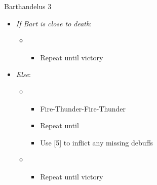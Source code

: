 \begin{battle}[1:24]{Barthandelus 3}
\begin{itemize}
			\item \textit{If Bart is close to death}:
			      \begin{itemize}
				      \item \first
				            \begin{itemize}
					            \item Repeat until victory
				            \end{itemize}
			      \end{itemize}
			\item \textit{Else}:
			      \begin{itemize}
				      \item \sixth
				            \begin{itemize}
					            \item Fire-Thunder-Fire-Thunder
					            \item Repeat until \stagger
					            \item Use [5] to inflict any missing debuffs
				            \end{itemize}
				      \item \first
				            \begin{itemize}
					            \item Repeat until victory
				            \end{itemize}
			      \end{itemize}
		\end{itemize}
\end{battle}
